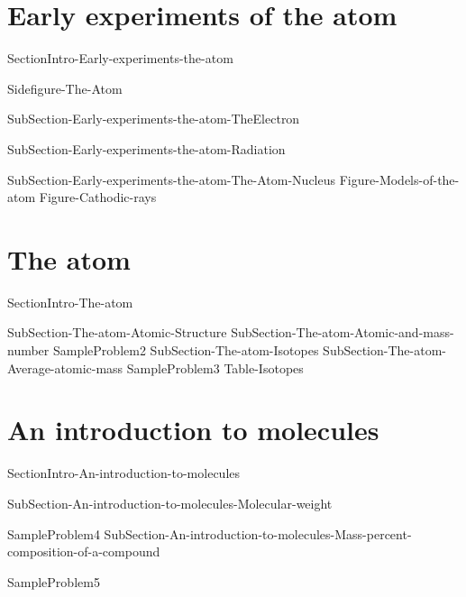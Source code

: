 \documentclass[main.tex]{subfiles}
\newcommand\chapterlabel{Ch-Table}\setcounter{figurenewcounter}{0}\setcounter{tablenewcounter}{0}\setcounter{formulanewcounter}{0}
\begin{document}
 \section{Early experiments of the atom}
{SectionIntro-Early-experiments-the-atom}
 \sloppy\begin{description}
  {Sidefigure-The-Atom}
\item[\docfilehook{Charge to mass ratio of an electron}{}] {SubSection-Early-experiments-the-atom-TheElectron}
\item[\docfilehook{Radiation}{}] {SubSection-Early-experiments-the-atom-Radiation}
\item[\docfilehook{The atom nucleus}{}] {SubSection-Early-experiments-the-atom-The-Atom-Nucleus}
 {Figure-Models-of-the-atom}
  {Figure-Cathodic-rays}

 

  \end{description}
 
\section{The atom}
{SectionIntro-The-atom}
\sloppy\begin{description}
{SubSection-The-atom-Atomic-Structure}
{SubSection-The-atom-Atomic-and-mass-number}
{SampleProblem2}
{SubSection-The-atom-Isotopes}
{SubSection-The-atom-Average-atomic-mass}
{SampleProblem3}
 {Table-Isotopes}
\end{description}
\section{An introduction to molecules}
{SectionIntro-An-introduction-to-molecules}
\sloppy
\begin{description}
{SubSection-An-introduction-to-molecules-Molecular-weight}
 
{SampleProblem4}
{SubSection-An-introduction-to-molecules-Mass-percent-composition-of-a-compound}
 
{SampleProblem5}
\end{description}
\end{document}
